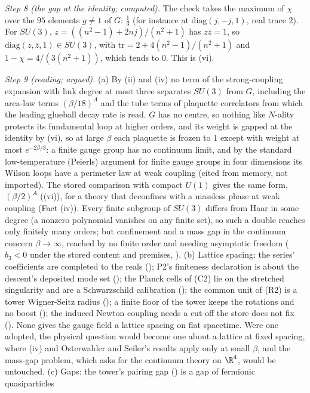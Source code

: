 \emph{Step 8 (the gap at the identity; computed).} The check takes the maximum of $\chi$ over the $95$ elements $g \neq 1$ of $G$: $\tfrac13$ (for instance at $\mathrm{diag}(j, -j, 1)$, real trace $2$). For $SU(3)$, $z = ((n^{2} - 1) + 2nj)/(n^{2} + 1)$ has $z\bar z = 1$, so $\mathrm{diag}(z, \bar z, 1) \in SU(3)$, with $\mathrm{tr} = 2 + 4(n^{2} - 1)/(n^{2} + 1)$ and $1 - \chi = 4/(3(n^{2} + 1))$, which tends to $0$. This is (vi).

\emph{Step 9 (reading; argued).} (a) By (ii) and (iv) no term of the strong-coupling expansion with link degree at most three separates $SU(3)$ from $G$, including the area-law terms $(\beta/18)^{A}$ and the tube terms of plaquette correlators from which the leading glueball decay rate is read. $G$ has no centre, so nothing like $N$-ality protects its fundamental loop at higher orders, and its weight is gapped at the identity by (vi), so at large $\beta$ each plaquette is frozen to $1$ except with weight at most $e^{-2\beta/3}$: a finite gauge group has no continuum limit, and by the standard low-temperature (Peierls) argument for finite gauge groups in four dimensions its Wilson loops have a perimeter law at weak coupling (cited from memory, not imported). The stored comparison with compact $U(1)$ gives the same form, $(\beta/2)^{A}$ ((vi)), for a theory that deconfines with a massless phase at weak coupling (Fact (iv)). Every finite subgroup of $SU(3)$ differs from Haar in some degree (a nonzero polynomial vanishes on any finite set), so such a double reaches only finitely many orders; but confinement and a mass gap in the continuum concern $\beta \to \infty$, reached by no finite order and needing asymptotic freedom ($b_{3} < 0$ under the stored content and premises, ). (b) Lattice spacing: the series' coefficients are completed to the reals (); P2's finiteness declaration is about the descent's deposited mode set (); the Planck cells of (C2) lie on the stretched singularity and are a Schwarzschild calibration (); the common unit of (R2) is a tower Wigner-Seitz radius (); a finite floor of the tower keeps the rotations and no boost (); the induced Newton coupling needs a cut-off the store does not fix (). None gives the gauge field a lattice spacing on flat spacetime. Were one adopted, the physical question would become one about a lattice at fixed spacing, where (iv) and Osterwalder and Seiler's results apply only at small $\beta$, and the mass-gap problem, which asks for the continuum theory on $\R^{4}$, would be untouched. (c) Gaps: the tower's pairing gap () is a gap of fermionic quasiparticles 